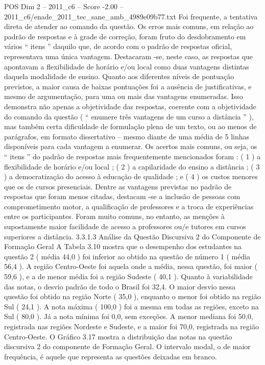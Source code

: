 \begin{textsample}{POS Dim 2 – 2011\_c6 – Score -2.00 – 2011\_c6/enade\_2011\_tec\_sane\_amb\_4989e09b77.txt}
Foi frequente, a tentativa direta de atender ao comando da questão.
Os erros mais comuns, em relação ao padrão de respostas e à grade de correção, foram fruto do desdobramento em vários “ itens ” daquilo que, de acordo com o padrão de respostas oficial, representava uma única vantagem.
Destacaram -se, neste caso, as respostas que apontavam a flexibilidade de horário e/ou local como duas vantagens distintas daquela modalidade de ensino.
Quanto aos diferentes níveis de pontuação previstos, a maior causa de baixas pontuações foi a ausência de justificativas, e mesmo de argumentação, para uma ou mais das vantagens enumeradas.
Isso demonstra não apenas a objetividade das respostas, coerente com a objetividade do comando da questão ( “ enumere três vantagens de um curso a distância ” ), mas também certa dificuldade de formulação plena de um texto, ou ao menos de parágrafos, em formato dissertativo – mesmo diante de uma média de 5 linhas disponíveis para cada vantagem a enumerar.
Os acertos mais comuns, ou seja, os “ itens ” do padrão de respostas mais frequentemente mencionados foram : ( 1 ) a flexibilidade de horário e/ou local ; ( 2 ) a capilaridade do ensino a distância ; ( 3 ) a democratização do acesso à educação de qualidade ; e ( 4 ) os custos menores que os de cursos presenciais.
Dentre as vantagens previstas no padrão de respostas que foram menos citadas, destacam -se a inclusão de pessoas com comprometimento motor, a qualificação de professores e a troca de experiências entre os participantes.
Foram muito comuns, no entanto, as menções à supostamente maior facilidade de acesso a professores ou/e tutores em cursos superiores a distância. 3.3.1.3 Análise da Questão Discursiva 2 do Componente de Formação Geral A Tabela 3.10 mostra que o desempenho dos estudantes na questão 2 ( média 44,0 ) foi inferior ao obtido na questão de número 1 ( média 56,4 ).
A região Centro-Oeste foi aquela onde a média, nessa questão, foi maior ( 59,6 ), e a de menor média foi a região Sudeste ( 40,1 ).
Quanto à variabilidade das notas, o desvio padrão de todo o Brasil foi 32,4.
O maior desvio nessa questão foi obtido na região Norte ( 35,0 ), enquanto o menor foi obtido na região Sul ( 24,1 ).
A nota máxima ( 100,0 ) foi a mesma em todas as regiões, exceto na Sul ( 80,0 ).
Já a nota mínima foi 0,0, sem exceções.
A menor mediana foi 50,0, registrada nas regiões Nordeste e Sudeste, e a maior foi 70,0, registrada na região Centro-Oeste.
O Gráfico 3.17 mostra a distribuição das notas na questão discursiva 2 do componente de Formação Geral.
O intervalo modal, o de maior frequência, é aquele que representa as questões deixadas em branco.

\end{textsample}
